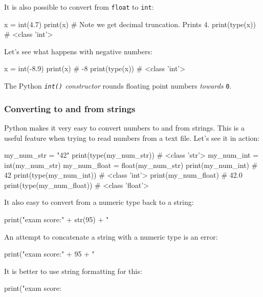 \documentclass[12pt]{article} \newif\ifsolution\solutiontrue %
\begin{document}
It is also possible to convert from \texttt{float} to \texttt{int}:

\begin{python}
x = int(4.7)
print(x)        # Note we get decimal truncation. Prints 4.
print(type(x))  # <class 'int'>
\end{python}

Let's see what happens with negative numbers:

\begin{python}
x = int(-8.9)
print(x)        # -8
print(type(x))  # <class 'int'>
\end{python}

The Python \emph{\texttt{int()} constructor} rounds floating point numbers
\emph{towards} \texttt{0}.

\subsubsection{Converting to and from
strings}\label{converting-to-and-from-strings}

Python makes it very easy to convert numbers to and from strings. This
is a useful feature when trying to read numbers from a text file. Let's
see it in action:

\begin{python}
my_num_str = "42"
print(type(my_num_str))           # <class 'str'>
my_num_int = int(my_num_str)
my_num_float = float(my_num_str)
print(my_num_int)                 # 42
print(type(my_num_int))           # <class 'int'>
print(my_num_float)               # 42.0
print(type(my_num_float))         # <class 'float'>
\end{python}

It also easy to convert from a numeric type back to a string:

\begin{python}
print("exam score:" + str(95) + "%
\end{python}

An attempt to concatenate a string with a numeric type is an error:

\begin{python}
print("exam score:" + 95 + "%
\end{python}

It is better to use string formatting for this:

\begin{python}
print("exam score: {}%
\end{python}
\end{document}

